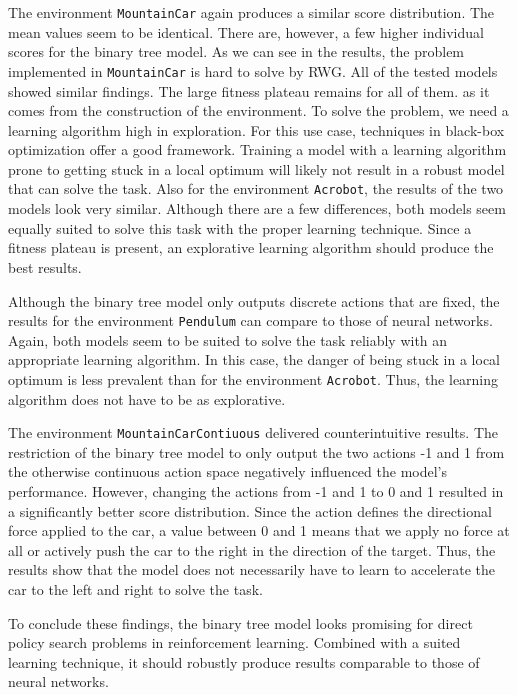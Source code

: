 The environment \verb|MountainCar| again produces a similar score distribution. The mean values seem to be identical. There are, however, a few higher individual scores for the binary tree model. As we can see in the results, the problem implemented in \verb|MountainCar| is hard to solve by RWG. All of the tested models showed similar findings. The large fitness plateau remains for all of them. as it comes from the construction of the environment. To solve the problem, we need a learning algorithm high in exploration. For this use case, techniques in black-box optimization offer a good framework. Training a model with a learning algorithm prone to getting stuck in a local optimum will likely not result in a robust model that can solve the task. Also for the environment \verb|Acrobot|, the results of the two models look very similar. Although there are a few differences, both models seem equally suited to solve this task with the proper learning technique. Since a fitness plateau is present, an explorative learning algorithm should produce the best results.

Although the binary tree model only outputs discrete actions that are fixed, the results for the environment \verb|Pendulum| can compare to those of neural networks. Again, both models seem to be suited to solve the task reliably with an appropriate learning algorithm. In this case, the danger of being stuck in a local optimum is less prevalent than for the environment \verb|Acrobot|. Thus, the learning algorithm does not have to be as explorative.

The environment \verb|MountainCarContiuous| delivered counterintuitive results. The restriction of the binary tree model to only output the two actions -1 and 1 from the otherwise continuous action space negatively influenced the model's performance. However, changing the actions from -1 and 1 to 0 and 1 resulted in a significantly better score distribution. Since the action defines the directional force applied to the car, a value between 0 and 1 means that we apply no force at all or actively push the car to the right in the direction of the target. Thus, the results show that the model does not necessarily have to learn to accelerate the car to the left and right to solve the task.

To conclude these findings, the binary tree model looks promising for direct policy search problems in reinforcement learning. Combined with a suited learning technique, it should robustly produce results comparable to those of neural networks.

